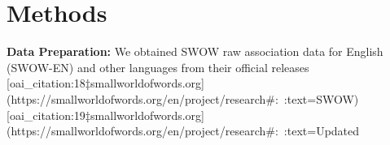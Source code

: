 \section*{Methods}
\textbf{Data Preparation:} We obtained SWOW raw association data for English (SWOW-EN) and other languages from their official releases [oai_citation:18‡smallworldofwords.org](https://smallworldofwords.org/en/project/research#:~:text=SWOW) [oai_citation:19‡smallworldofwords.org](https://smallworldofwords.org/en/project/research#:~:text=Updated%

